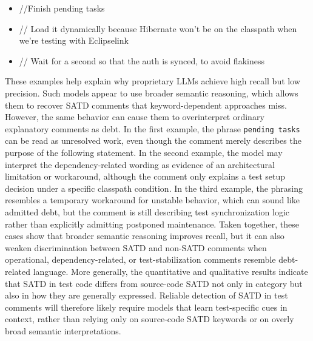 \begin{itemize}[itemsep=-2pt]
    \item \textcolor{commentColor}{//Finish pending tasks}
    \item \textcolor{commentColor}{// Load it dynamically because Hibernate won't be on the classpath when we're testing with Eclipselink}
    \item \textcolor{commentColor}{// Wait for a second so that the auth is synced, to avoid flakiness}
\end{itemize}


These examples help explain why proprietary LLMs achieve high recall but low precision. Such models appear to use broader semantic reasoning, which allows them to recover SATD comments that keyword-dependent approaches miss. However, the same behavior can cause them to overinterpret ordinary explanatory comments as debt. In the first example, the phrase \texttt{pending tasks} can be read as unresolved work, even though the comment merely describes the purpose of the following statement. In the second example, the model may interpret the dependency-related wording as evidence of an architectural limitation or workaround, although the comment only explains a test setup decision under a specific classpath condition. In the third example, the phrasing resembles a temporary workaround for unstable behavior, which can sound like admitted debt, but the comment is still describing test synchronization logic rather than explicitly admitting postponed maintenance. Taken together, these cases show that broader semantic reasoning improves recall, but it can also weaken discrimination between SATD and non-SATD comments when operational, dependency-related, or test-stabilization comments resemble debt-related language. More generally, the quantitative and qualitative results indicate that SATD in test code differs from source-code SATD not only in category but also in how they are generally expressed. Reliable detection of SATD in test comments will therefore likely require models that learn test-specific cues in context, rather than relying only on source-code SATD keywords or on overly broad semantic interpretations.


